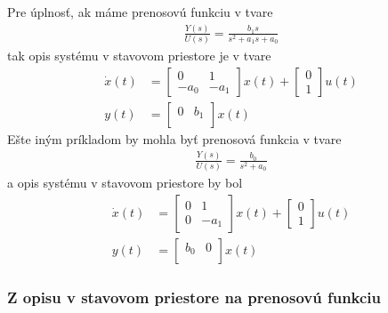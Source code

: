 \documentclass[a4paper, 10pt, ]{article}
\begin{document}
Pre úplnosť, ak máme prenosovú funkciu v tvare
\begin{align} 
	\frac{Y(s)}{U(s)} = \frac{b_1 s }{ s^2 + a_1 s + a_0}
\end{align}
tak opis systému v stavovom priestore je v tvare
\begin{subequations}
\begin{align}
    \dot x(t)
    &=
    \begin{bmatrix}
    	0 & 1 \\
    	- a_0 & - a_1
  	\end{bmatrix}
    x(t)
    +
    \begin{bmatrix}
    	  0 \\
          1
 	\end{bmatrix}
    u(t)
    \\
    y(t)
    &=
    \begin{bmatrix}
        0 & b_1 \\
    \end{bmatrix}
    x(t)
\end{align}
\end{subequations}
Ešte iným príkladom by mohla byť prenosová funkcia v tvare
\begin{align} 
	\frac{Y(s)}{U(s)} = \frac{b_0 }{ s^2 +  a_0}
\end{align}
a opis systému v stavovom priestore by bol
\begin{subequations}
    \begin{align}
        \dot x(t)
        &=
        \begin{bmatrix}
            0 & 1 \\
            0 & - a_1
          \end{bmatrix}
        x(t)
        +
        \begin{bmatrix}
              0 \\
              1
         \end{bmatrix}
        u(t)
        \\
        y(t)
        &=
        \begin{bmatrix}
            b_0 & 0 \\
        \end{bmatrix}
        x(t)
\end{align}
\end{subequations}



\subsubsection{Z opisu v stavovom priestore na prenosovú funkciu}
\end{document}
